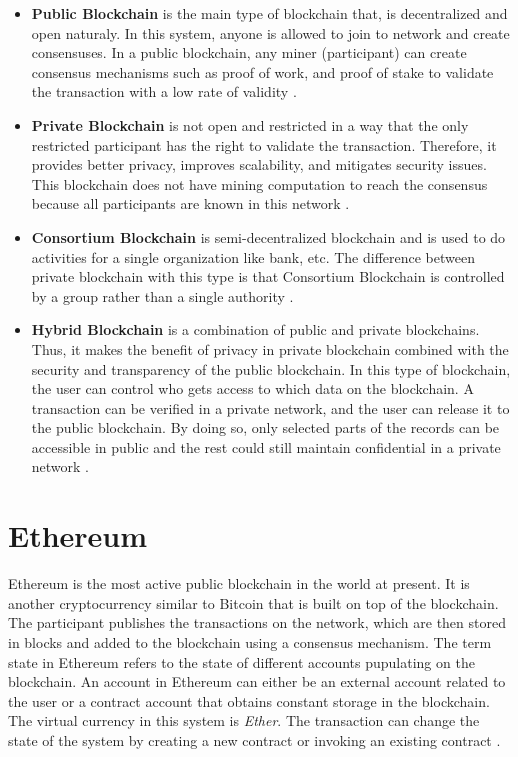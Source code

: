 \begin{itemize}
    \item \textbf{Public Blockchain} is the main type of blockchain that, is decentralized and open naturaly. In this system, anyone is allowed to join to network and create consensuses. In a public blockchain, any miner (participant) can create consensus mechanisms such as proof of work, and proof of stake to validate the transaction with a low rate of validity \cite{Kalra}.
    \item \textbf{Private Blockchain} is not open and restricted in a way that the only restricted participant has the right to validate the transaction. Therefore, it provides better privacy, improves scalability, and mitigates security issues. This blockchain does not have mining computation to reach the consensus because all participants are known in this network \cite{Kalra}. 
    \item \textbf{Consortium Blockchain} is semi-decentralized blockchain and is used to do activities for a single organization like bank, etc. The difference between private blockchain with this type is that Consortium Blockchain is controlled by a group rather than a single authority \cite{Aithal}.
    \item \textbf{Hybrid Blockchain} is a combination of public and private blockchains. Thus, it makes the benefit of privacy in private blockchain combined with the security and transparency of the public blockchain. In this type of blockchain, the user can control who gets access to which data on the blockchain. A transaction can be verified in a private network, and the user can release it to the public blockchain. By doing so, only selected parts of the records can be accessible in public and the rest could still maintain confidential in a private network \cite{Aithal}. 
\end{itemize}

 \section{Ethereum}
Ethereum is the most active public blockchain in the world at present. It is another cryptocurrency similar to Bitcoin that is built on top of the blockchain. The participant publishes the transactions on the network, which are then stored in blocks and added to the blockchain using a consensus mechanism. The term state in Ethereum refers to the state of different accounts pupulating on the blockchain. An account in Ethereum can either be an external account related to the user or a contract account that obtains constant storage in the blockchain. The virtual currency in this system is \textit{Ether}. The transaction can change the state of the system by creating a new contract or invoking an existing contract \cite{Ilya}.

